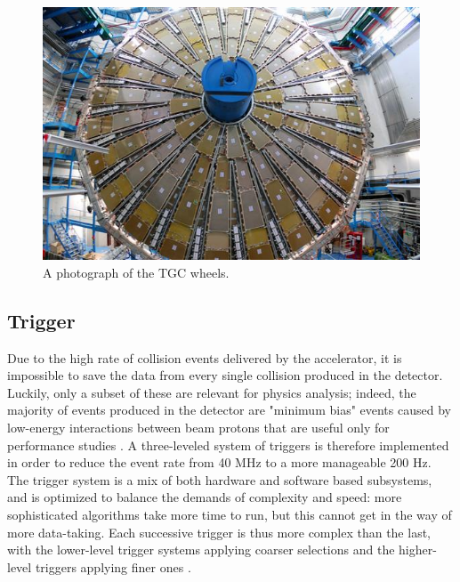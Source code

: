 \begin{figure}[ht!]
  \includegraphics[width=\linewidth]{figures/detector_chapter/TGCWheel.png}
  \caption{A photograph of the TGC wheels. \cite{TGCWheel}}
  \label{fig:TGCWheel}
\end{figure}

\subsection{Trigger} \label{sec:Trigger}
Due to the high rate of collision events delivered by the accelerator, it is impossible to save the data from every single collision produced in the detector. Luckily, only a subset of these are relevant for physics analysis; indeed, the majority of events produced in the detector are "minimum bias" events caused by low-energy interactions between beam protons that are useful only for performance studies \cite{MBTS}. A three-leveled system of triggers is therefore implemented in order to reduce the event rate from 40 MHz to a more manageable 200 Hz. The trigger system is a mix of both hardware and software based subsystems, and is optimized to balance the demands of complexity and speed: more sophisticated algorithms take more time to run, but this cannot get in the way of more data-taking. Each successive trigger is thus more complex than the last, with the lower-level trigger systems applying coarser selections and the higher-level triggers applying finer ones \cite{trigger}.

